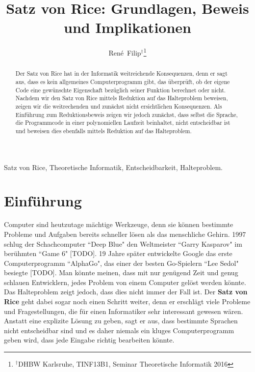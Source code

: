\documentclass[journal]{IEEEtran}
\begin{document}
\newtheorem{definition}{Definition}
\newtheorem{theorem}[definition]{Satz}
\newtheorem{corollar}[definition]{Korollar}
\newtheorem{example}[definition]{Beispiel}

\renewcommand{\proofname}{Beweis}

\title{Satz von Rice: Grundlagen, Beweis und Implikationen}


\author{René~Filip$^{\dag}$\thanks{$^{\dag}$DHBW Karlsruhe, TINF13B1, Seminar Theoretische Informatik 2016}}


\maketitle


\begin{abstract}
Der Satz von Rice hat in der Informatik weitreichende Konsequenzen, denn er sagt aus, dass es kein allgemeines Computerprogramm gibt, das überprüft, ob der eigene Code eine gewünschte Eigenschaft bezüglich seiner Funktion berechnet oder nicht. Nachdem wir den Satz von Rice mittels Reduktion auf das Halteproblem beweisen, zeigen wir die weitrechenden und zunächst nicht ersichtlichen Konsequenzen. Als Einführung zum Reduktionsbeweis zeigen wir jedoch zunächst, dass selbst die Sprache, die Programmcode in einer polynomiellen Laufzeit beinhaltet, nicht entscheidbar ist und beweisen dies ebenfalls mittels Reduktion auf das Halteproblem.
\end{abstract}


\begin{IEEEkeywords}
  Satz von Rice, Theoretische Informatik, Entscheidbarkeit, Halteproblem.
\end{IEEEkeywords}






\section{Einführung}

Computer sind heutzutage mächtige Werkzeuge, denn sie können bestimmte Probleme und Aufgaben bereits schneller lösen als das menschliche Gehirn. 1997 schlug der Schachcomputer ``Deep Blue" den Weltmeister ``Garry Kasparov" im berühmten ``Game 6" [TODO]. 19 Jahre später entwickelte Google das erste Computerprogramm ``AlphaGo", das einer der besten Go-Spielern ``Lee Sedol" besiegte [TODO]. Man könnte meinen, dass mit nur genügend Zeit und genug schlauen Entwicklern, jedes Problem von einem Computer gelöst werden könnte. Das Halteproblem zeigt jedoch, dass dies nicht immer der Fall ist. Der \textbf{Satz von Rice} geht dabei sogar noch einen Schritt weiter, denn er erschlägt viele Probleme und Fragestellungen, die für einen Informatiker sehr interessant gewesen wären. Anstatt eine explizite Lösung zu geben, sagt er aus, dass bestimmte Sprachen nicht entscheidbar sind und es daher niemals ein kluges Computerprogramm geben wird, dass jede Eingabe richtig bearbeiten könnte.
\end{document}
